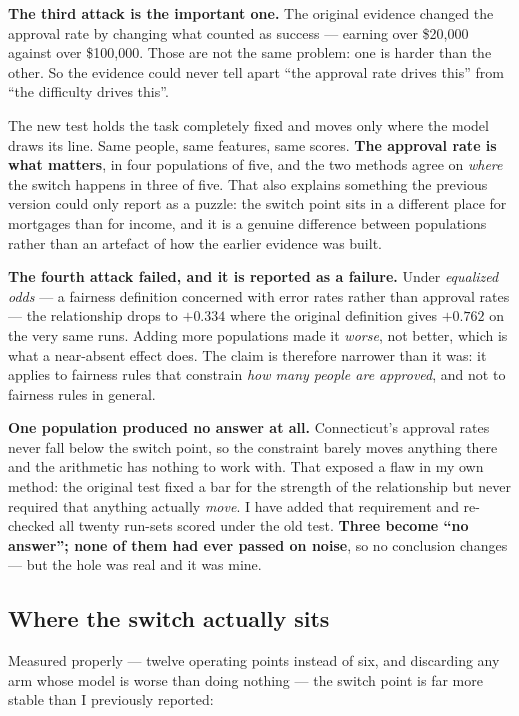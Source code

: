 \documentclass[11pt,a4paper]{article}
\begin{document}
\textbf{The third attack is the important one.} The original evidence changed the approval
rate by changing what counted as success --- earning over \$20{,}000 against over
\$100{,}000. Those are not the same problem: one is harder than the other. So the evidence
could never tell apart ``the approval rate drives this'' from ``the difficulty drives
this''.

The new test holds the task completely fixed and moves only where the model draws its line.
Same people, same features, same scores. \textbf{The approval rate is what matters}, in four
populations of five, and the two methods agree on \emph{where} the switch happens in three of
five. That also explains something the previous version could only report as a puzzle: the
switch point sits in a different place for mortgages than for income, and it is a genuine
difference between populations rather than an artefact of how the earlier evidence was built.

\textbf{The fourth attack failed, and it is reported as a failure.} Under
\emph{equalized odds} --- a fairness definition concerned with error rates rather than
approval rates --- the relationship drops to $+0.334$ where the original definition gives
$+0.762$ on the very same runs. Adding more populations made it \emph{worse}, not better,
which is what a near-absent effect does. The claim is therefore narrower than it was: it
applies to fairness rules that constrain \emph{how many people are approved}, and not to
fairness rules in general.

\textbf{One population produced no answer at all.} Connecticut's approval rates never fall
below the switch point, so the constraint barely moves anything there and the arithmetic has
nothing to work with. That exposed a flaw in my own method: the original test fixed a bar for
the strength of the relationship but never required that anything actually \emph{move}. I have
added that requirement and re-checked all twenty run-sets scored under the old test.
\textbf{Three become ``no answer''; none of them had ever passed on noise}, so no conclusion
changes --- but the hole was real and it was mine.

\subsection{Where the switch actually sits}

Measured properly --- twelve operating points instead of six, and discarding any arm whose
model is worse than doing nothing --- the switch point is far more stable than I previously
reported:
\end{document}
